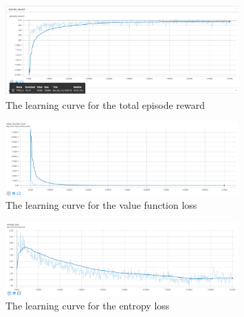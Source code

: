 \documentclass{article}
\begin{document}
\begin{figure}[H]
	\centering
	\includegraphics[width=0.8\textwidth]{../trainplots/EpisodeReward}
	\caption{The learning curve for the total episode reward}
\end{figure}
\begin{figure}[H]
	\centering
	\includegraphics[width=0.8\textwidth]{../trainplots/ValueLoss}
	\caption{The learning curve for the value function loss}
\end{figure}
\begin{figure}[H]
	\centering
	\includegraphics[width=0.8\textwidth]{../trainplots/EntropyLoss}
	\caption{The learning curve for the entropy loss}
\end{figure}



\end{document}
